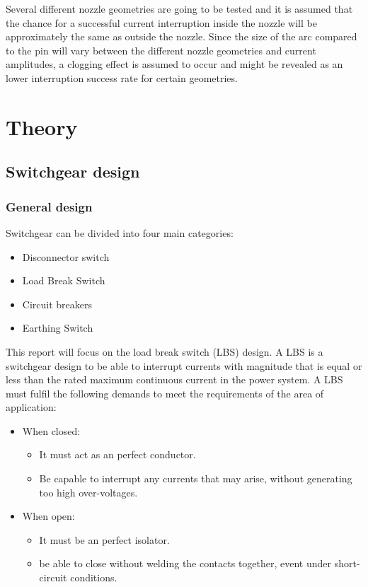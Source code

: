 \documentclass[10pt,a4paper]{article}
\begin{document}
Several different nozzle geometries are going to be tested and it is assumed that the chance for a successful current interruption inside the nozzle will be approximately the same as outside the nozzle. Since the size of the arc compared to the pin will vary between the different nozzle geometries and current amplitudes, a clogging effect is assumed to occur and might be revealed as an lower interruption success rate for certain geometries.

\newpage
\section{Theory}
\subsection{Switchgear design}
\subsubsection{General design}
Switchgear can be divided into four main categories:
\begin{itemize}
\item Disconnector switch
\item Load Break Switch
\item Circuit breakers
\item Earthing Switch
\end{itemize}
This report will focus on the load break switch (LBS) design. A LBS is a switchgear design to be able to interrupt currents with magnitude that is equal or less than the rated maximum continuous current in the power system. A LBS must fulfil the following demands to meet the requirements of the area of application:

\begin{itemize}
\item When closed:
	\begin{itemize}
		\item It must act as an perfect conductor.
		\item Be capable to interrupt any currents that may arise, without generating too high over-voltages. 
	\end{itemize}
\item When open:
	\begin{itemize}
		\item It must be an perfect isolator.
		\item be able to close without welding the contacts together, event under short-circuit conditions.
	\end{itemize}
\end{itemize}
\end{document}
